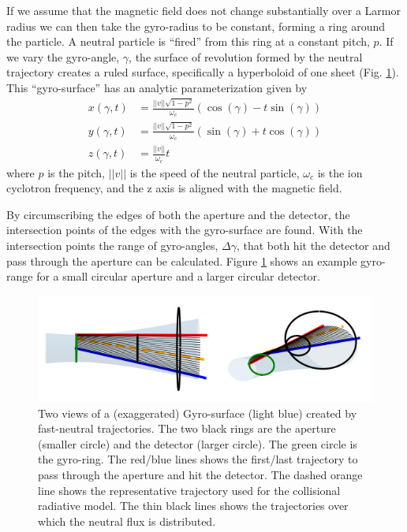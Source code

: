 If we assume that the magnetic field does not change substantially over a Larmor radius we can then take the gyro-radius to be constant, forming a ring around the particle. A neutral particle is ``fired'' from this ring at a constant pitch, $p$. If we vary the gyro-angle, $\gamma$, the surface of revolution formed by the neutral trajectory creates a ruled surface, specifically a hyperboloid of one sheet (Fig. \ref{fig:npa_intersect}). This ``gyro-surface'' has an analytic parameterization given by
\begin{equation}\label{eq:hyperboloid}
\begin{split}
    x(\gamma,t) &= \frac{||v||\sqrt{1-p^2}}{\omega_c}\left(\cos(\gamma) - t\sin(\gamma)\right) \\
    y(\gamma,t) &= \frac{||v||\sqrt{1-p^2}}{\omega_c}\left(\sin(\gamma) + t\cos(\gamma)\right) \\
    z(\gamma,t) &= \frac{||v||}{\omega_c}t
\end{split}
\end{equation}
where $p$ is the pitch, $||v||$ is the speed of the neutral particle, $\omega_c$ is the ion cyclotron frequency, and the z axis is aligned with the magnetic field.

By circumscribing the edges of both the aperture and the detector, the intersection points of the edges with the gyro-surface are found. With the intersection points the range of gyro-angles, $\Delta \gamma$, that both hit the detector and pass through the aperture can be calculated. Figure \ref{fig:npa_intersect} shows an example gyro-range for a small circular aperture and a larger circular detector.
\begin{figure}[h!]
    \centering
    \includegraphics[width=12cm]{figures/npa_intersection.jpg}
    \caption{Two views of a (exaggerated) Gyro-surface (light blue) created by fast-neutral trajectories. The two black rings are the aperture (smaller circle) and the detector (larger circle). The green circle is the gyro-ring. The red/blue lines shows the first/last trajectory to pass through the aperture and hit the detector. The dashed orange line shows the representative trajectory used for the collisional radiative model. The thin black lines shows the trajectories over which the neutral flux is distributed.}
    \label{fig:npa_intersect}
\end{figure}

